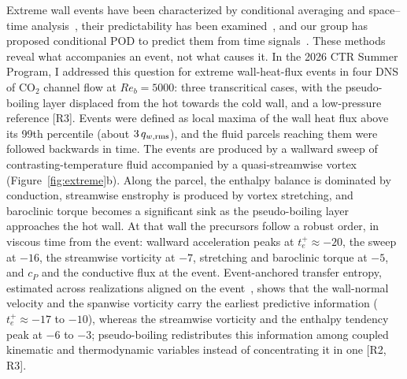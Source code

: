 \documentclass[11pt]{article}
\begin{document}
Extreme wall events have been characterized by conditional averaging and space--time
analysis~\cite{Guerrero2020,Hack2021,Zhang2023}, their predictability has been
examined~\cite{Blonigan2019}, and our group has proposed conditional POD to predict them from time
signals~\cite{Martin2025}. These methods reveal what accompanies an event, not what causes it.
In the 2026 CTR Summer Program, I addressed this question for extreme wall-heat-flux events in
four DNS of CO$_2$ channel flow at $Re_b=5000$: three transcritical cases, with the pseudo-boiling
layer displaced from the hot towards the cold wall, and a low-pressure reference [R3]. Events were
defined as local maxima of the wall heat flux above its 99th percentile (about $3\,q_{w,\rm rms}$),
and the fluid parcels reaching them were followed backwards in time. The events are produced by a
wallward sweep of contrasting-temperature fluid accompanied by a quasi-streamwise vortex
(Figure~\ref{fig:extreme}b). Along the parcel, the enthalpy balance is dominated by conduction,
streamwise enstrophy is produced by vortex stretching, and baroclinic torque becomes a significant
sink as the pseudo-boiling layer approaches the hot wall. At that wall the precursors follow a
robust order, in viscous time from the event: wallward acceleration peaks at
$t_e^+\approx-20$, the sweep at $-16$, the streamwise vorticity at $-7$, stretching and baroclinic
torque at $-5$, and $c_P$ and the conductive flux at the event. Event-anchored transfer entropy,
estimated across realizations aligned on the event~\cite{Schreiber2000,Wollstadt2014}, shows that
the wall-normal velocity and the spanwise vorticity carry the earliest predictive information
($t_e^+\approx-17$ to $-10$), whereas the streamwise vorticity and the enthalpy tendency peak at
$-6$ to $-3$; pseudo-boiling redistributes this information among coupled kinematic and
thermodynamic variables instead of concentrating it in one [R2, R3].
\end{document}

